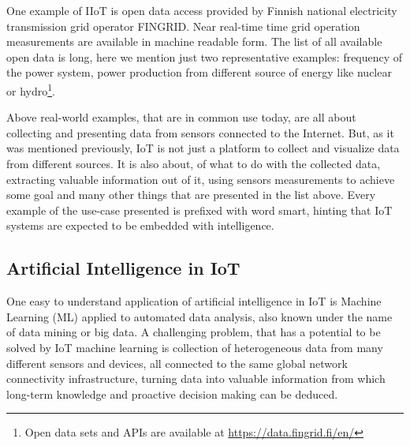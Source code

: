 \documentclass[english, 12pt, a4paper, elec, utf8, online]{aaltothesis}
\begin{document}
One example of IIoT is open data access provided by Finnish national electricity transmission grid operator FINGRID. Near real-time time grid operation measurements are available in machine readable form. The list of all available open data is long, here we mention just two representative examples: frequency of the power system, power production from different source of energy like nuclear or hydro\footnote{Open data sets and APIs are available at \url{https://data.fingrid.fi/en/}}.  

Above real-world examples, that are in common use today, are all about collecting and presenting data from sensors connected to the Internet. But, as it was mentioned previously, IoT is not just a platform to collect and visualize data from different sources. It is also about, of what to do with the collected data, extracting valuable information out of it, using sensors measurements to achieve some goal and many other things that are presented in the list above. Every example of the use-case presented is prefixed with word smart, hinting that IoT systems are expected to be embedded with intelligence. 


\subsection{Artificial Intelligence in IoT}
One easy to understand application of artificial intelligence in IoT is Machine Learning (ML) applied to automated data analysis, also known under the name of data mining or big data. A challenging problem, that has a potential to be solved by IoT machine learning is collection of heterogeneous data from many different sensors and devices, all connected to the same global network connectivity infrastructure, turning data into valuable information from which long-term knowledge and proactive decision making can be deduced. 
\end{document}
